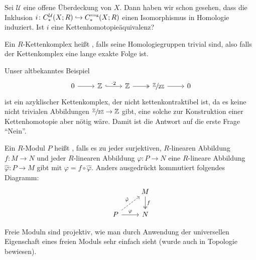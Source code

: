 \begin{frage}
	Sei $\mathcal{U}$ eine offene Überdeckung von $X$. 
	Dann haben wir schon gesehen, dass die Inklusion $i \colon C_*^\mathcal{U}(X;R) \hookrightarrow C_*^\sing(X;R)$ einen Isomorphismus in Homologie induziert. 
	Ist $i$ eine Kettenhomotopieäquivalenz?
\end{frage}

\begin{definition}[{name=[azyklischer Kettenkomplex]}]
	Ein $R$-Kettenkomplex heißt , falls seine Homologiegruppen trivial sind, also falls der Kettenkomplex eine lange exakte Folge ist.
\end{definition}

\begin{beispiel}[{name=[Beispiel eines azyklischen Kettenkomplex]}]
	Unser altbekanntes Beispiel
	\[
		\begin{tikzcd}
			0 \rar & \mathbb{Z} \rar["\cdot 2",hook] & \mathbb{Z} \rar[two heads] & \sfrac{\mathbb{Z}}{2 \mathbb{Z}} \rar & 0
		\end{tikzcd}
	\]
	ist ein azyklischer Kettenkomplex, der nicht kettenkontraktibel ist, da es keine nicht trivialen Abbildungen $\sfrac{\mathbb{Z}}{2 \mathbb{Z}} \to \mathbb{Z}$ gibt, eine solche zur Konstruktion einer Kettenhomotopie aber nötig wäre.
	Damit ist die Antwort auf die erste Frage \enquote{Nein}.
\end{beispiel}

\begin{definition}[{name=[projektiver Modul]},label=def_projektiv]
	Ein $R$-Modul $P$ heißt , falls es zu jeder surjektiven, $R$-linearen Abbildung $f \colon M \to N$ und jeder $R$-linearen Abbildung
	$\varphi \colon P \to N$ eine $R$-lineare Abbildung $\hat{\varphi} \colon P \to M$ gibt mit $\varphi= f \circ \hat{\varphi}$. Anders ausgedrückt kommutiert folgendes Diagramm:
	\[
		\begin{tikzcd}
			\mbox{ } & M \dar[two heads,"f"] \\
			P \rar["\varphi"] \urar["\hat{\varphi}",dashed] & N
		\end{tikzcd}
	\]
\end{definition}

\begin{beispiel}[{name=[Freie Moduln sind projektiv]}]
	Freie Moduln sind projektiv, wie man durch Anwendung der universellen Eigenschaft eines freien Moduls sehr einfach sieht (wurde auch in Topologie  bewiesen).
\end{beispiel}

